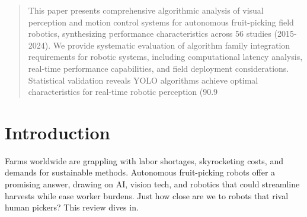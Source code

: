 \documentclass[a4paper,fleqn]{cas-dc}
\begin{document}
\begin{abstract}
This paper presents comprehensive algorithmic analysis of visual perception and motion control systems for autonomous fruit-picking field robotics, synthesizing performance characteristics across 56 studies (2015-2024). We provide systematic evaluation of algorithm family integration requirements for robotic systems, including computational latency analysis, real-time performance capabilities, and field deployment considerations. Statistical validation reveals YOLO algorithms achieve optimal characteristics for real-time robotic perception (90.9%
\end{abstract}

\section{Introduction}
Farms worldwide are grappling with labor shortages, skyrocketing costs, and demands for sustainable methods. Autonomous fruit-picking robots offer a promising answer, drawing on AI, vision tech, and robotics that could streamline harvests while ease worker burdens. Just how close are we to robots that rival human pickers? This review dives in. 
\end{document}
